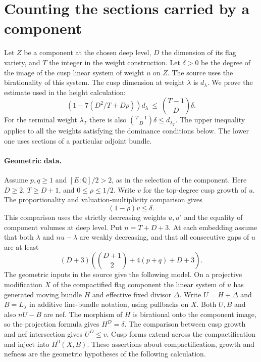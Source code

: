 \section{Counting the sections carried by a component}
\label{sec:rank-share}
Let \(Z\) be a component at the chosen deep level, \(D\) the dimension of
its flag variety, and \(T\) the integer in the weight construction. Let
\(\delta>0\) be the degree of the image of the cusp linear system of
weight \(u\) on \(Z\). The source uses the birationality of this system.
The cusp dimension at weight \(\lambda\) is \(d_\lambda\). We prove
the estimate used in the height calculation:
\begin{equation}\label{eq:rank-share-count}
 \left(1-7(D^2/T+D\rho)\right)d_\lambda
 \ \le\ \binom{T-1}{D}\delta .
\end{equation}
For the terminal weight \(\lambda_T\) there is also
\(\binom{T-1}{D}\delta\le d_{\lambda_T}\).
The upper inequality applies to all the weights satisfying the dominance
conditions below. The lower one uses sections of a particular adjoint bundle.

\paragraph{Geometric data.}
Assume \(p,q\ge1\) and \([E:\mathbb Q]/2>2\), as in the selection of the
component. Here \(D\ge2\), \(T\ge D+1\), and \(0\le\rho\le1/2\).
Write \(v\) for the top-degree cusp growth of \(u\). The proportionality
and valuation-multiplicity comparison gives
\begin{equation}\label{eq:rankshare-vol}
 (1-\rho)v\le\delta .
\end{equation}
This comparison uses the strictly decreasing weights \(u,u'\) and the
equality of component volumes at deep level. Put \(n=T+D+3\). At each
embedding assume that both \(\lambda\) and \(nu-\lambda\) are weakly
decreasing, and that all consecutive gaps of \(u\) are at least
\[
 (D+3)\left(\binom{D+1}{2}+4(p+q)+D+3\right).
\]
The geometric inputs in the source give the following model.
On a projective modification \(X\) of the compactified flag component the
linear system of \(u\) has generated moving bundle \(H\) and effective
fixed divisor \(\Delta\). Write \(U=H+\Delta\) and \(B=L_\lambda\)
in additive line-bundle notation, using pullbacks on \(X\). Both
\(U,B\) and also \(nU-B\) are nef. The morphism of \(H\) is birational
onto the component image, so the projection formula gives \(H^D=\delta\).
The comparison between cusp growth and nef intersection gives \(U^D\le v\).
Cusp forms extend across the compactification and inject into \(H^0(X,B)\).
These assertions about compactification, growth and nefness are the
geometric hypotheses of the following calculation.


